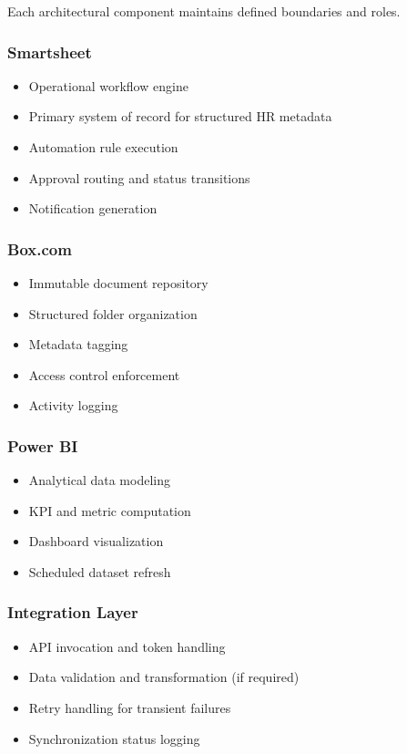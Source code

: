 \documentclass[12pt]{article}
\begin{document}
Each architectural component maintains defined boundaries and roles.

\subsubsection{Smartsheet}

\begin{itemize}
    \item Operational workflow engine
    \item Primary system of record for structured HR metadata
    \item Automation rule execution
    \item Approval routing and status transitions
    \item Notification generation
\end{itemize}

\subsubsection{Box.com}

\begin{itemize}
    \item Immutable document repository
    \item Structured folder organization
    \item Metadata tagging
    \item Access control enforcement
    \item Activity logging
\end{itemize}

\subsubsection{Power BI}

\begin{itemize}
    \item Analytical data modeling
    \item KPI and metric computation
    \item Dashboard visualization
    \item Scheduled dataset refresh
\end{itemize}

\subsubsection{Integration Layer}

\begin{itemize}
    \item API invocation and token handling
    \item Data validation and transformation (if required)
    \item Retry handling for transient failures
    \item Synchronization status logging
\end{itemize}
\end{document}
